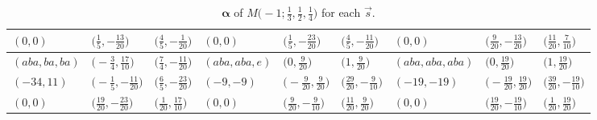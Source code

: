 \documentclass[pdftex]{sigma}
\def\bal{\boldsymbol{\alpha}}
\theoremstyle{definition}
\numberwithin{equation}{section}
\begin{document}
\begin{landscape}
\begin{table}[th]
\begin{tabular}{|lll|lll|lll|}
\\
$(0, 0)$ & $\bigl(\frac{1}{5}, -\frac{13}{20}\bigr)$ & $\bigl(\frac{4}{5}, -\frac{1}{20}\bigr)$ & $(0, 0)$ & $\bigl(\frac{1}{5}, -\frac{23}{20}\bigr)$ & $\bigl(\frac{4}{5}, -\frac{11}{20}\bigr)$ & $(0, 0)$ & $\bigl(\frac{9}{20}, -\frac{13}{20}\bigr)$ & $\bigl(\frac{11}{20}, \frac{7}{10}\bigr)$
\\\hline
$(aba, ba, ba)$ & $\bigl(-\frac{3}{4}, \frac{17}{10}\bigr)$ & $\bigl(\frac{7}{4}, -\frac{11}{20}\bigr)$ & $(aba, aba, e)$ & $\bigl(0, \frac{9}{20}\bigr)$ & $\bigl(1, \frac{9}{20}\bigr)$ & $(aba, aba, aba)$ & $\bigl(0, \frac{19}{20}\bigr)$ & $\bigl(1, \frac{19}{20}\bigr)$
\\
$(-34, 11)$ & $\bigl(-\frac{1}{5}, -\frac{11}{20}\bigr)$ & $\bigl(\frac{6}{5}, -\frac{23}{20}\bigr)$ & $(-9, -9)$ & $\bigl(-\frac{9}{20}, \frac{9}{20}\bigr)$ & $\bigl(\frac{29}{20}, -\frac{9}{10}\bigr)$ & $(-19, -19)$ & $\bigl(-\frac{19}{20}, \frac{19}{20}\bigr)$ & $\bigl(\frac{39}{20}, -\frac{19}{10}\bigr)$
\\
$(0, 0)$ & $\bigl(\frac{19}{20}, -\frac{23}{20}\bigr)$ & $\bigl(\frac{1}{20}, \frac{17}{10}\bigr)$ & $(0, 0)$ & $\bigl(\frac{9}{20}, -\frac{9}{10}\bigr)$ & $\bigl(\frac{11}{20}, \frac{9}{20}\bigr)$ & $(0, 0)$ & $\bigl(\frac{19}{20}, -\frac{19}{10}\bigr)$ & $\bigl(\frac{1}{20}, \frac{19}{20}\bigr)$ \\ \hline
\end{tabular}
 \caption{$\bal$ of $M\bigl( -1;\frac{1}{3},\frac{1}{2}, \frac{1}{4} \bigr)$ for each $\vec s$.} \label{tab:balinrangePseudo}
\end{table}


\end{landscape}
\end{document}
